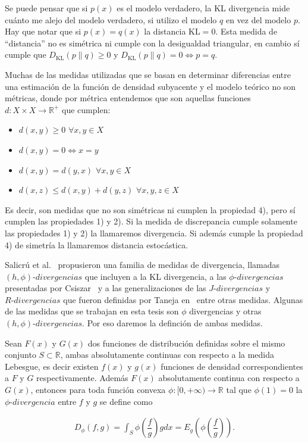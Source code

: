 Se puede pensar que si $p(x)$ es el modelo verdadero, la KL divergencia mide cu\'anto me alejo del modelo verdadero, si utilizo el modelo $q$ en vez del modelo $p$. Hay que notar que si $p(x)=q(x)$ la distancia $\text{KL}=0.$ Esta medida de ``distancia'' no es sim\'etrica ni cumple con la desigualdad triangular,  en cambio s\'i cumple que $D_{\text{KL}}(p \rVert q)\geq 0$ y $D_{\text{KL}}(p \rVert q)= 0 \Longleftrightarrow p=q.$ 

Muchas de las medidas utilizadas que se basan en determinar diferencias entre una estimación de la función de densidad subyacente y el modelo teórico no son métricas, donde por métrica entendemos que son aquellas funciones $d:X \times X\rightarrow \mathbb{R}^+$ que cumplen:

\begin{itemize}
	\label{metrica}
	\item $d(x,y)\geq 0$ $\forall x,y \in X$
	\item $d(x,y)= 0 \Leftrightarrow x=y$
	\item $d(x,y)=d(y,x)$  $\forall x,y \in X$
	\item $d(x,z)\leq d(x,y)+d(y,z)$  $\forall x,y,z \in X$
\end{itemize} 

Es decir, son medidas que no son simétricas ni cumplen la propiedad 4), pero sí cumplen las propiedades 1) y 2). Si la medida de discrepancia cumple solamente las propiedades 1) y 2) la llamaremos divergencia. Si además cumple la propiedad 4) de simetría la llamaremos distancia estocástica. 

Salicrú et al.~\cite{Salicru1994} propusieron una familia de medidas de divergencia, llamadas $(h,\phi) \text{-} divergencias$ que incluyen a la KL divergencia, a las $\phi \text{-} divergencias$ presentadas por Csiszar~\cite{Csiszar1967} y a las generalizaciones de las $J \text{-} divergencias$ y $R \text{-} divergencias$ que fueron definidas por Taneja en~\cite{Taneja1989} entre otras medidas. Algunas de las medidas que se trabajan en esta tesis son $\phi$ divergencias y otras  $(h,\phi) \text{-} divergencias$. Por eso daremos la definción de ambas medidas.

\begin{definition}
	\label{fiDivergencia}
	Sean $F(x)$ y $G(x)$ dos funciones de distribución definidas sobre el mismo conjunto $S \subset \mathbb{R}$, ambas absolutamente continuas con respecto a la medida Lebesgue, es decir existen $f(x)$ y $g(x)$ funciones de densidad correspondientes a $F$ y $G$ respectivamente. Además $F(x)$ absolutamente continua con respecto a $G(x)$, entonces para toda función convexa $\phi:[0,+\infty)\longrightarrow \mathbb{R}$ tal que $\phi(1)=0$ la $\phi \text{-} divergencia$ entre $f$ y $g$ se define como
	
	\begin{align}
		D_{\phi}(f, g)=\int_{S}  \phi\left(\dfrac{f}{g}\right) g dx=E_{g}\left(\phi\left(\dfrac{f}{g}\right)\right).
	\end{align}
\end{definition}

